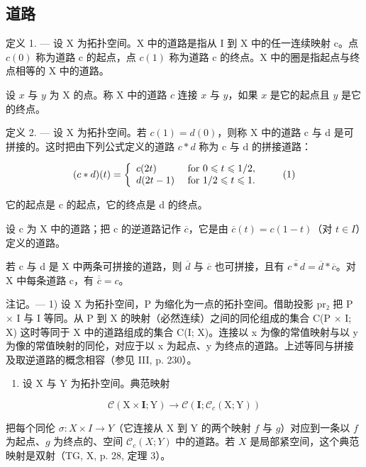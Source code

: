 \subsection{道路}

定义 1. --- 设 X 为拓扑空间。X 中的道路是指从 I 到 X 中的任一连续映射 c。点 \(c(0)\) 称为道路 c 的起点，点 \(c(1)\) 称为道路 c 的终点。X 中的圈是指起点与终点相等的 X 中的道路。

设 \(x\) 与 \(y\) 为 X 的点。称 X 中的道路 \(c\) 连接 \(x\) 与 \(y\)，如果 \(x\) 是它的起点且 \(y\) 是它的终点。

定义 2. --- 设 X 为拓扑空间。若 \(c(1) = d(0)\)，则称 X 中的道路 c 与 d 是可拼接的。这时把由下列公式定义的道路 \(c*d\) 称为 c 与 d 的拼接道路：

\[
(c * d) (t) = \left\{ \begin{array}{l l} c (2 t) & \text { for } 0 \leqslant t \leqslant 1 / 2, \\ d (2 t - 1) & \text { for } 1 / 2 \leqslant t \leqslant 1. \end{array} \right.\tag{1}
\]

它的起点是 c 的起点，它的终点是 d 的终点。

设 c 为 X 中的道路；把 c 的逆道路记作 \(\overline{c}\)，它是由 \(\overline{c}(t) = c(1 - t)\)（对 \(t \in I\)）定义的道路。

若 c 与 d 是 X 中两条可拼接的道路，则 \(\overline{d}\) 与 \(\overline{c}\) 也可拼接，且有 \(\overline{c*d} = \overline{d} * \overline{c}\)。对 X 中每条道路 c，有 \(\overline{\overline{c}} = c\)。

注记。--- 1) 设 X 为拓扑空间，P 为缩化为一点的拓扑空间。借助投影 pr₂ 把 P × I 与 I 等同。从 P 到 X 的映射（必然连续）之间的同伦组成的集合 C(P × I; X) 这时等同于 X 中的道路组成的集合 C(I; X)。连接以 x 为像的常值映射与以 y 为像的常值映射的同伦，对应于以 x 为起点、y 为终点的道路。上述等同与拼接及取逆道路的概念相容（参见 III, p. 230）。

\begin{enumerate}
\def\labelenumi{\arabic{enumi})}
\setcounter{enumi}{1}
\tightlist
\item
  设 X 与 Y 为拓扑空间。典范映射
\end{enumerate}

\[
\mathcal {C} (\mathrm{X} \times \mathbf {I}; \mathrm{Y}) \rightarrow \mathcal {C} (\mathbf {I}; \mathcal {C} _ {c} (\mathrm{X}; \mathrm{Y}))
\]

把每个同伦 \(\sigma\colon X \times I \to Y\)（它连接从 X 到 Y 的两个映射 \(f\) 与 \(g\)）对应到一条以 \(f\) 为起点、\(g\) 为终点的、空间 \(\mathcal{C}_c(X;Y)\) 中的道路。若 \(X\) 是局部紧空间，这个典范映射是双射（TG, X, p. 28, 定理 3）。

